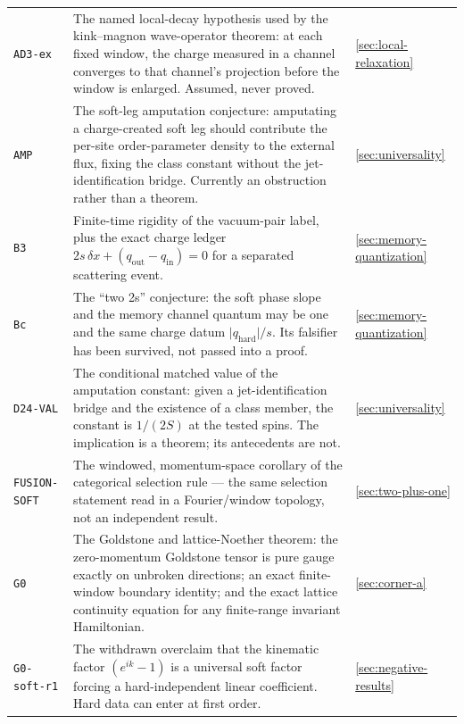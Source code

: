 {\begin{longtable}{@{}p{}p{}p{}@{}}
\texttt{AD3-ex} & The named local-decay hypothesis used by the kink--magnon
wave-operator theorem: at each fixed window, the charge measured in a channel
converges to that channel's projection before the window is enlarged. Assumed,
never proved. & \cref{sec:local-relaxation}\\

\texttt{AMP} & The soft-leg amputation conjecture: amputating a
charge-created soft leg should contribute the per-site order-parameter density
to the external flux, fixing the class constant without the jet-identification
bridge. Currently an obstruction rather than a theorem. & \cref{sec:universality}\\

\texttt{B3} & Finite-time rigidity of the vacuum-pair label, plus the exact
charge ledger $2s\,\delta x+(q_{\mathrm{out}}-q_{\mathrm{in}})=0$ for a
separated scattering event. & \cref{sec:memory-quantization}\\

\texttt{Bc} & The ``two 2s'' conjecture: the soft phase slope and the memory
channel quantum may be one and the same charge datum
$\lvert q_{\mathrm{hard}}\rvert/s$. Its falsifier has been survived, not
passed into a proof. & \cref{sec:memory-quantization}\\

\texttt{D24-VAL} & The conditional matched value of the amputation constant:
given a jet-identification bridge and the existence of a class member, the
constant is $1/(2S)$ at the tested spins. The implication is a theorem; its
antecedents are not. & \cref{sec:universality}\\

\texttt{FUSION-SOFT} & The windowed, momentum-space corollary of the
categorical selection rule --- the same selection statement read in a
Fourier/window topology, not an independent result. & \cref{sec:two-plus-one}\\

\texttt{G0} & The Goldstone and lattice-Noether theorem: the zero-momentum
Goldstone tensor is pure gauge exactly on unbroken directions; an exact
finite-window boundary identity; and the exact lattice continuity equation for
any finite-range invariant Hamiltonian. & \cref{sec:corner-a}\\

\texttt{G0-soft-r1} & The withdrawn overclaim that the kinematic factor
$(e^{ik}-1)$ is a universal soft factor forcing a hard-independent linear
coefficient. Hard data can enter at first order. & \cref{sec:negative-results}\\


\end{longtable}}
